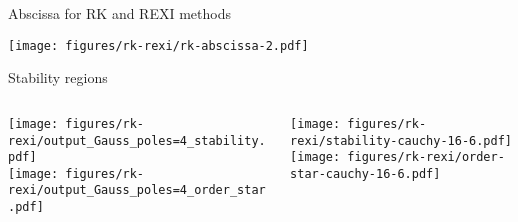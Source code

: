 \documentclass{beamer}
\begin{document}
\begin{frame}{Abscissa for RK and REXI methods}
  \begin{center}
    \texttt{[image: figures/rk-rexi/rk-abscissa-2.pdf]}
  \end{center}
\end{frame}


\begin{frame}{Stability regions}
  \begin{columns}
    \begin{column}{.5\textwidth}
      \texttt{[image: figures/rk-rexi/output\_Gauss\_poles=4\_stability.pdf]} \\
      \texttt{[image: figures/rk-rexi/output\_Gauss\_poles=4\_order\_star.pdf]}
    \end{column}
    \begin{column}{.5\textwidth}
      \texttt{[image: figures/rk-rexi/stability-cauchy-16-6.pdf]} \\
      \texttt{[image: figures/rk-rexi/order-star-cauchy-16-6.pdf]}
    \end{column}
  \end{columns}
\end{frame}

\end{document}
